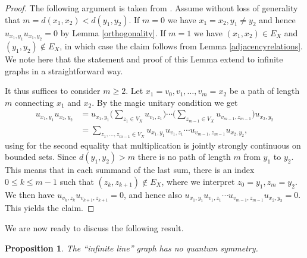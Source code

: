 \documentclass[a4paper]{amsart}
\numberwithin{equation}{section}
\theoremstyle{change}
\newtheorem{prop}[theorem]{Proposition}
\begin{document}
\begin{proof} 
The following argument is taken from \cite[Lemma 3.2]{SCHMIDT_distancetransitive}. Assume without loss of generality that $ m = d(x_1, x_2) < d(y_1, y_2) $. 
If $ m = 0 $ we have $ x_1 = x_2, y_1 \neq y_2 $ and hence $ u_{x_1, y_1} u_{x_1, y_2} = 0 $ 
by Lemma \ref{orthogonality}. If $ m = 1 $ we have $ (x_1, x_2) \in E_X $ and $ (y_1, y_2) \notin E_X $, in which case the claim follows from Lemma \ref{adjacencyrelations}. 
We note here that the statement and proof of this Lemma extend to infinite graphs in a straightforward way. 

It thus suffices to consider $ m \geq 2 $. Let $ x_1 = v_0, v_1, \dots, v_m = x_2 $ be a path of length $ m $ connecting $ x_1 $ and $ x_2 $. By the magic unitary condition we get 
\begin{align*}
u_{x_1, y_1} u_{x_2, y_2} &= u_{x_1, y_1} \bigg(\sum_{z_1 \in V_X} u_{v_1, z_1} \bigg) \cdots \bigg(\sum_{z_{m - 1} \in V_X} u_{v_{m - 1}, z_{m - 1}} \bigg) u_{x_2, y_2} \\
&= \sum_{z_1, \dots, z_{m - 1} \in V_X} u_{x_1, y_1} u_{v_1, z_1} \cdots u_{v_{m - 1}, z_{m - 1}} u_{x_2, y_2}, 
\end{align*} 
using for the second equality that multiplication is jointly strongly continuous on bounded sets. 
Since $ d(y_1, y_2) > m $ there is no path of length $ m $ from $ y_1 $ to $ y_2 $. This means that in each summand of the last sum, there is an 
index $ 0 \leq k \leq m - 1 $ such that $ (z_k, z_{k + 1}) \notin E_X $, where we interpret $ z_0 = y_1, z_m = y_2 $. We then have $ u_{v_k, z_k} u_{v_{k + 1}, z_{k + 1}} = 0 $, 
and hence also $ u_{x_1, y_1} u_{v_1, z_1} \cdots u_{v_{m - 1}, z_{m - 1}} u_{x_2, y_2} = 0 $. This yields the claim. 
\end{proof} 

We are now ready to discuss the following result. 

\begin{prop} \label{linegraph}
The ``infinite line'' graph has no quantum symmetry. 
\end{prop} 
\end{document}
